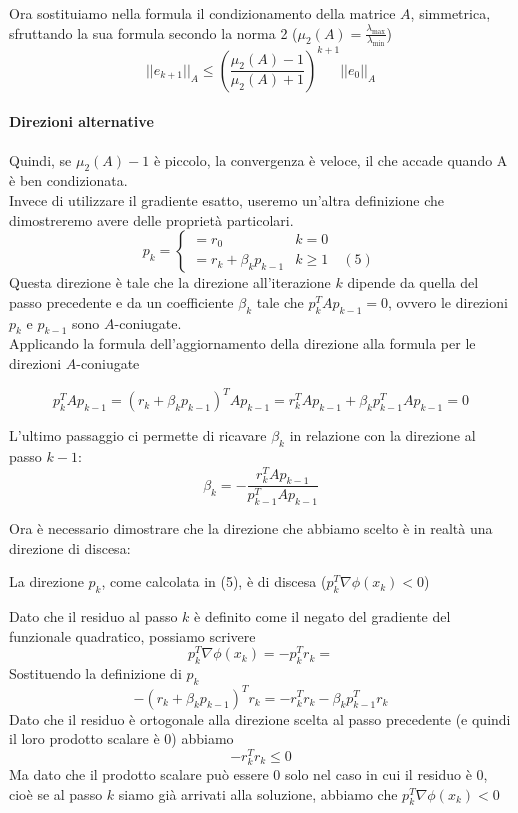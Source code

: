 Ora sostituiamo nella formula il condizionamento della matrice $A$, simmetrica,
sfruttando la sua formula secondo la norma 2 ($ \mu_{2}(A) =
\frac{\lambda_{\max}}{\lambda_{\min}}$)
$$ || e_{k+1} ||_{A} \leq 
\left( \frac{\mu_{2}(A) -1 }{\mu_{2}(A) +1}\right)^{k+1}
||{e_{0}}||_{A}$$

\paragraph{Direzioni alternative}
Quindi, se $\mu_{2}(A) -1$ \`e piccolo, la convergenza \`e veloce, il che
accade quando A \`e ben condizionata.  \\ Invece di utilizzare il
gradiente esatto, useremo un'altra definizione che dimostreremo avere
delle proprietà particolari.
$$
p_{k} = \left\{
\begin{array}{ll} = r_0 & k=0 \\ = r_{k} + \beta_{k}p_{k-1} & k \geq 1
\quad (5)
\end{array} \right.
$$
Questa direzione \`e tale che la direzione all'iterazione $k$ dipende da
quella del passo precedente e da un coefficiente $\beta_{k}$ tale che
$p_{k}^{T} A p_{k-1} = 0$, ovvero le direzioni $p_{k}$ e $p_{k-1}$
sono $A$-coniugate.  \\ Applicando la formula dell'aggiornamento della
direzione alla formula per le direzioni $A$-coniugate

$$ p_{k}^{T}Ap_{k-1}= (r_{k}+ \beta_{k} p_{k-1})^{T} A  p_{k-1} = 
  r_{k}^{T} A p_{k-1} + \beta_{k} p_{k-1}^{T} A p_{k-1}=0$$

L'ultimo passaggio ci permette di ricavare $\beta_{k}$ in relazione
con la direzione al passo $k-1$:
$$
\beta_{k}= -\frac{r_{k}^{T}Ap_{k-1}}{p_{k-1}^{T}Ap_{k-1}}
$$

Ora \`e necessario dimostrare che la direzione che abbiamo scelto \`e in
realtà una direzione di discesa:

\begin{theo} La direzione $p_{k}$, come calcolata in (5), \`e di discesa
($p_{k}^{T}\nabla \phi(x_{k})<0$)
\end{theo}
\begin{thproof} Dato che il residuo al passo $k$ \`e definito come il
negato del gradiente del funzionale quadratico, possiamo scrivere
 $$ p_{k}^{T} \nabla \phi(x_{k}) = 
  -p_{k}^{T} r_{k} =
$$
Sostituendo la definizione di $p_{k}$
$$
  - (r_{k} + \beta_{k} p_{k-1})^{T} r_{k} = - r_{k}^{T} r_{k} -
\beta_{k} p_{k-1}^{T} r_{k}
$$
Dato che il residuo \`e ortogonale alla direzione scelta al passo
precedente (e quindi il loro prodotto scalare \`e 0) abbiamo
$$
-r_{k}^{T}r_{k} \leq 0
$$
Ma dato che il prodotto scalare può essere 0 solo nel caso in cui il
residuo \`e 0, cio\`e se al passo $k$ siamo già arrivati alla soluzione,
abbiamo che $ p_{k}^{T} \nabla \phi(x_{k}) < 0$
\end{thproof}

